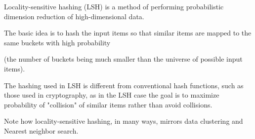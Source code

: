 Locality-sensitive hashing (LSH) is a method of performing probabilistic dimension reduction of high-dimensional data. 

The basic idea is to hash the input items so that similar items are mapped to the same buckets with high probability

(the number of buckets being much smaller than the universe of possible input items). 

The hashing used in LSH is different from conventional hash functions, such as those used in cryptography, as in the LSH case
the goal is to maximize probability of "collision" of similar items rather than avoid collisions. 

Note how locality-sensitive hashing, in many ways, mirrors data clustering and Nearest neighbor search.


